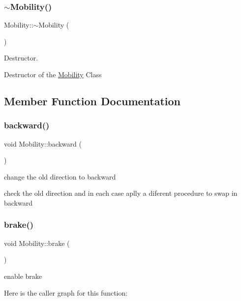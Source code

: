 \subsubsection{\texorpdfstring{$\sim$\+Mobility()}{~Mobility()}}
{\footnotesize\ttfamily Mobility\+::$\sim$\+Mobility (\begin{DoxyParamCaption}{ }\end{DoxyParamCaption})}



Destructor. 

Destructor of the \hyperlink{class_mobility}{Mobility} Class\textquotesingle{} 

\subsection{Member Function Documentation}
\mbox{\label{class_mobility_a201de04cf2f094283d20f77f2520a96f}} 
\subsubsection{\texorpdfstring{backward()}{backward()}}
{\footnotesize\ttfamily void Mobility\+::backward (\begin{DoxyParamCaption}{ }\end{DoxyParamCaption})}



change the old direction to backward 

check the old direction and in each case aplly a diferent procedure to swap in backward \mbox{\label{class_mobility_a287c595643b0ac17019ee9b875e96c72}} 
\subsubsection{\texorpdfstring{brake()}{brake()}}
{\footnotesize\ttfamily void Mobility\+::brake (\begin{DoxyParamCaption}{ }\end{DoxyParamCaption})}



enable brake 

Here is the caller graph for this function\+:
\mbox{\label{class_mobility_a9208362074642bb10b5868e7cc75395c}} 
